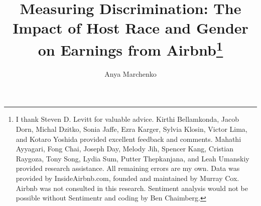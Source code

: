 \documentclass[11pt, oneside]{article}
\begin{document}
\begin{comment}
Options for first sentence of abstract:
\begin{enumerate}
\item The extent of discrimination on Airbnb, especially against hosts, remains poorly researched. 
\item Despite well-publicized efforts by Airbnb to address discrimination on its platform, the discrimination against hosts remains poorly measured by economists. 
\item Even though discrimination against hosts on Airbnb carries serious economic consequences for agents, the issue has remained poorly researched. 
\item Measuring discrimination is challenging because in the absence of an experiment, it requires controlling for an extensive set of covariates. 
\item Little research has been done on the extent of discrimination against hosts on Airbnb because of data restrictions, and difficulty of setting up an experiment. 
\end{enumerate}
\end{comment}


\title{Measuring Discrimination: The Impact of Host Race and Gender on Earnings from Airbnb\footnote
	{I thank Steven D. Levitt for valuable advice. Kirthi Bellamkonda, Jacob Dorn, Michal Dzitko, Sonia Jaffe, Ezra Karger, Sylvia Klosin, Victor Lima, and Kotaro Yoshida provided excellent feedback and comments. Mahathi Ayyagari, Fong Chai, Joseph Day, Melody Jih, Spencer Kang, Cristian Raygoza, Tony Song, Lydia Sum, Putter Thepkanjana, and Leah Umanskiy provided research assistance. All remaining errors are my own. Data was provided by InsideAirbnb.com, founded and maintained by Murray Cox. Airbnb was not consulted in this research. Sentiment analysis would not be possible without Sentimentr and coding by Ben Chaimberg.}}
\author{Anya Marchenko}
\maketitle
\end{document}
